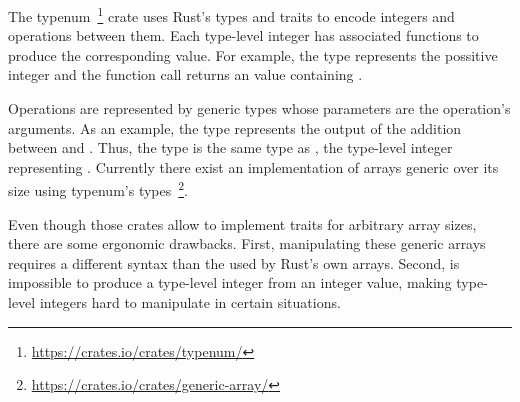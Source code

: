 The typenum~\footnote{\url{https://crates.io/crates/typenum/}} crate uses Rust's
types and traits to encode integers and operations between them. Each type-level
integer has associated functions to produce the corresponding value. For
example, the type  represents the possitive integer  and
the function call  returns an  value
containing . 

Operations are represented by generic types whose parameters are the operation's
arguments. As an example, the type  represents the output of
the addition between  and . Thus, the type
 is the same type as , the type-level integer
representing . Currently there exist an implementation of arrays
generic over its size using typenum's
types~\footnote{\url{https://crates.io/crates/generic-array/}}.

Even though those crates allow to implement traits for arbitrary array sizes,
there are some ergonomic drawbacks. First, manipulating these generic arrays requires a
different syntax than the used by Rust's own arrays. Second, is impossible to
produce a type-level integer from an integer value, making type-level integers
hard to manipulate in certain situations.
